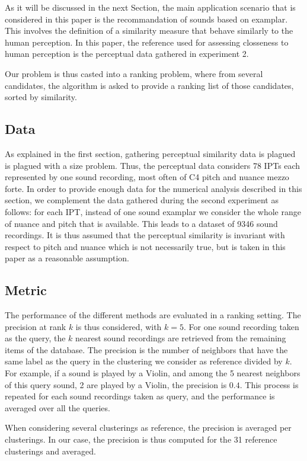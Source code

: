 \documentclass{article}
\newcommand{\ipt}{IPT\xspace}
\newcommand{\ipts}{IPTs\xspace}
\begin{document}
As it will be discussed in the next Section, the main application scenario that is considered in this paper is the recommandation of sounds based on examplar. This involves the definition of a similarity measure that behave similarly to the human perception. In this paper, the reference used for assessing closseness to human perception is the perceptual data gathered in experiment 2.

Our problem is thus casted into a ranking problem, where from several candidates, the algorithm is asked to provide a ranking list of those candidates, sorted by similarity.

\subsection{Data}

As explained in the first section, gathering perceptual similarity data is plagued is plagued with a size problem. Thus, the perceptual data considers 78 \ipts each represented by one sound recording, most often of C4 pitch and nuance mezzo forte. In order to provide enough data for the numerical analysis described in this section, we complement the data gathered during the second experiment as follows: for each \ipt, instead of one sound examplar we consider the whole range of nuance and pitch that is available. This leads to a dataset of 9346 sound recordings. It is thus assumed that the perceptual similarity is invariant with respect to pitch and nuance which is not necessarily true, but is taken in this paper as a reasonable assumption.

\subsection{Metric}

The performance of the different methods are evaluated in a ranking setting. The precision at rank $k$ is thus considered, with $k=5$. For one sound recording taken as the query, the $k$ nearest sound recordings are retrieved from the remaining items of the database. The precision is the number of neighbors that have the same label as the query in the clustering we consider as reference divided by $k$. For example, if a sound is played by a Violin, and among the 5 nearest neighbors of this query sound, 2 are played by a Violin, the precision is $0.4$. This process is repeated for each sound recordings taken as query, and the performance is averaged over all the queries.

When considering several clusterings as reference, the precision is averaged per clusterings. In our case, the precision is thus computed for the 31 reference clusterings and averaged.
\end{document}
